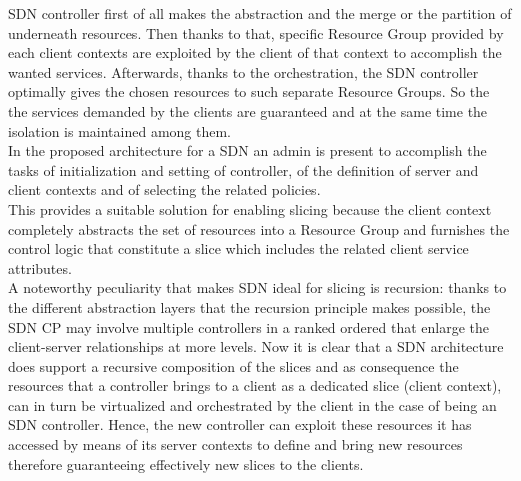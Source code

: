 \documentclass[a4paper,12pt]{report} %
\begin{document}
SDN controller first of all makes the abstraction and the
merge or the partition of underneath resources. Then thanks to that, specific Resource Group provided by each client contexts are exploited by the client of that context to accomplish the wanted services. Afterwards, thanks to the orchestration, the SDN controller  optimally gives the chosen resources
to such separate Resource Groups. So the the services demanded by the clients are guaranteed
and at the same time the isolation is maintained among them. \\
In the proposed architecture for a SDN an admin is present to accomplish the tasks of initialization and setting of controller, of the definition
of server and client contexts and of selecting the related policies.\\
This provides a suitable solution for enabling slicing because the client context completely abstracts the set of resources into a Resource Group and furnishes the control
logic that constitute a slice which includes the related client service attributes.\\
A noteworthy peculiarity that makes SDN
ideal for slicing is recursion: thanks to the different abstraction layers
that the recursion principle makes possible, the SDN
CP may involve multiple controllers in a ranked ordered that enlarge the client-server
relationships at more levels. Now it is clear that a SDN architecture does support a
recursive composition of the slices and as consequence
the resources that a controller brings to a client as a dedicated slice (client context), can in turn be
virtualized and orchestrated by the client in the
case of being an SDN controller. Hence, the new
controller can exploit these resources it has accessed by means of
its server contexts to define and bring
new resources therefore guaranteeing effectively new slices to the
clients. \cite{ordonez2017network}
\end{document}
